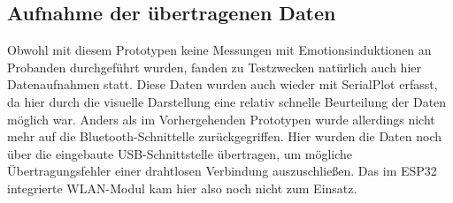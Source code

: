 \subsection{Aufnahme der {\"u}bertragenen Daten} \label{aufnahme-daten-subsec}

Obwohl mit diesem Prototypen keine Messungen mit Emotionsinduktionen an Probanden durchgeführt wurden, fanden zu Testzwecken natürlich auch hier Datenaufnahmen statt. Diese Daten wurden auch wieder mit SerialPlot erfasst, da hier durch die visuelle Darstellung eine relativ schnelle Beurteilung der Daten möglich war. Anders als im Vorhergehenden Prototypen wurde allerdings nicht mehr auf die Bluetooth-Schnittelle zurückgegriffen. Hier wurden die Daten noch über die eingebaute USB-Schnittstelle übertragen, um mögliche Übertragungsfehler einer drahtlosen Verbindung auszuschließen. Das im ESP32 integrierte WLAN-Modul kam hier also noch nicht zum Einsatz.